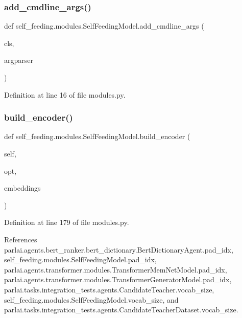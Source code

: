 \subsubsection{\texorpdfstring{add\+\_\+cmdline\+\_\+args()}{add\_cmdline\_args()}}
{\footnotesize\ttfamily def self\+\_\+feeding.\+modules.\+Self\+Feeding\+Model.\+add\+\_\+cmdline\+\_\+args (\begin{DoxyParamCaption}\item[{}]{cls,  }\item[{}]{argparser }\end{DoxyParamCaption})}



Definition at line 16 of file modules.\+py.

\mbox{\label{classself__feeding_1_1modules_1_1SelfFeedingModel_a895c868ad8a892d71cfc13849e48ad87}} 
\subsubsection{\texorpdfstring{build\+\_\+encoder()}{build\_encoder()}}
{\footnotesize\ttfamily def self\+\_\+feeding.\+modules.\+Self\+Feeding\+Model.\+build\+\_\+encoder (\begin{DoxyParamCaption}\item[{}]{self,  }\item[{}]{opt,  }\item[{}]{embeddings }\end{DoxyParamCaption})}



Definition at line 179 of file modules.\+py.



References parlai.\+agents.\+bert\+\_\+ranker.\+bert\+\_\+dictionary.\+Bert\+Dictionary\+Agent.\+pad\+\_\+idx, self\+\_\+feeding.\+modules.\+Self\+Feeding\+Model.\+pad\+\_\+idx, parlai.\+agents.\+transformer.\+modules.\+Transformer\+Mem\+Net\+Model.\+pad\+\_\+idx, parlai.\+agents.\+transformer.\+modules.\+Transformer\+Generator\+Model.\+pad\+\_\+idx, parlai.\+tasks.\+integration\+\_\+tests.\+agents.\+Candidate\+Teacher.\+vocab\+\_\+size, self\+\_\+feeding.\+modules.\+Self\+Feeding\+Model.\+vocab\+\_\+size, and parlai.\+tasks.\+integration\+\_\+tests.\+agents.\+Candidate\+Teacher\+Dataset.\+vocab\+\_\+size.

